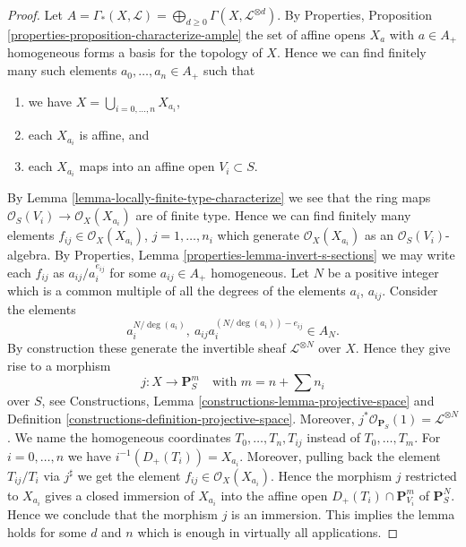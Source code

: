 \begin{proof}
Let
$A = \Gamma_*(X, \mathcal{L}) =
\bigoplus_{d \geq 0} \Gamma(X, \mathcal{L}^{\otimes d})$.
By Properties, Proposition \ref{properties-proposition-characterize-ample}
the set of affine opens $X_a$ with $a \in A_{+}$ homogeneous forms
a basis for the topology of $X$. Hence we can find finitely
many such elements $a_0, \ldots, a_n \in A_{+}$ such that
\begin{enumerate}
\item we have $X = \bigcup_{i = 0, \ldots, n} X_{a_i}$,
\item each $X_{a_i}$ is affine, and
\item each $X_{a_i}$ maps into an affine open $V_i \subset S$.
\end{enumerate}
By Lemma \ref{lemma-locally-finite-type-characterize}
we see that the ring maps
$\mathcal{O}_S(V_i) \to \mathcal{O}_X(X_{a_i})$ are
of finite type. Hence we can find finitely many
elements $f_{ij} \in \mathcal{O}_X(X_{a_i})$, $j = 1, \ldots, n_i$
which generate $\mathcal{O}_X(X_{a_i})$ as an $\mathcal{O}_S(V_i)$-algebra.
By Properties, Lemma \ref{properties-lemma-invert-s-sections}
we may write each
$f_{ij}$ as $a_{ij}/a_i^{e_{ij}}$ for some
$a_{ij} \in A_{+}$ homogeneous. Let $N$ be a positive integer which
is a common multiple of all the degrees of the elements
$a_i$, $a_{ij}$. Consider the elements
$$
a_i^{N/\deg(a_i)}, \ a_{ij}a_i^{(N/\deg(a_i)) - e_{ij}} \in A_N.
$$
By construction these generate the invertible sheaf
$\mathcal{L}^{\otimes N}$ over $X$. Hence they give rise
to a morphism
$$
j : X \longrightarrow
\mathbf{P}_S^{m}
\quad
\text{with } m = n + \sum n_i
$$
over $S$, see Constructions, Lemma \ref{constructions-lemma-projective-space}
and Definition \ref{constructions-definition-projective-space}.
Moreover, $j^*\mathcal{O}_{\mathbf{P}_S}(1) = \mathcal{L}^{\otimes N}$.
We name the homogeneous coordinates $T_0, \ldots, T_n, T_{ij}$
instead of $T_0, \ldots, T_m$.
For $i = 0, \ldots, n$ we have $i^{-1}(D_{+}(T_i)) = X_{a_i}$.
Moreover, pulling back the element $T_{ij}/T_i$ via $j^\sharp$ we
get the element $f_{ij} \in \mathcal{O}_X(X_{a_i})$.
Hence the morphism $j$ restricted to $X_{a_i}$
gives a closed immersion of $X_{a_i}$ into the affine open
$D_{+}(T_i) \cap \mathbf{P}^m_{V_i}$ of $\mathbf{P}^N_S$.
Hence we conclude that the morphism $j$ is an immersion.
This implies the lemma holds for some $d$ and $n$ which is enough
in virtually all applications.


\end{proof}
